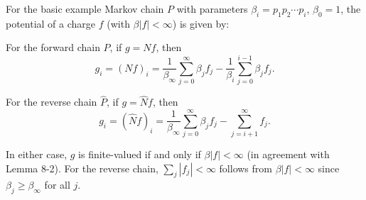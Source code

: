 For the basic example Markov chain $P$ with parameters $\beta_i = p_1 p_2 \cdots p_i$, $\beta_0 = 1$, the potential of a charge $f$ (with $\beta|f| < \infty$) is given by:

For the forward chain $P$, if $g = Nf$, then
$$g_i = (Nf)_i = \frac{1}{\beta_\infty} \sum_{j=0}^{\infty} \beta_j f_j - \frac{1}{\beta_i} \sum_{j=0}^{i-1} \beta_j f_j. \tag{1}$$

For the reverse chain $\hat{P}$, if $g = \hat{N}f$, then
$$g_i = (\hat{N}f)_i = \frac{1}{\beta_\infty} \sum_{j=0}^{\infty} \beta_j f_j - \sum_{j=i+1}^{\infty} f_j. \tag{2}$$

In either case, $g$ is finite-valued if and only if $\beta|f| < \infty$ (in agreement with Lemma 8-2). For the reverse chain, $\sum_j |f_j| < \infty$ follows from $\beta|f| < \infty$ since $\beta_j \geq \beta_\infty$ for all $j$.
